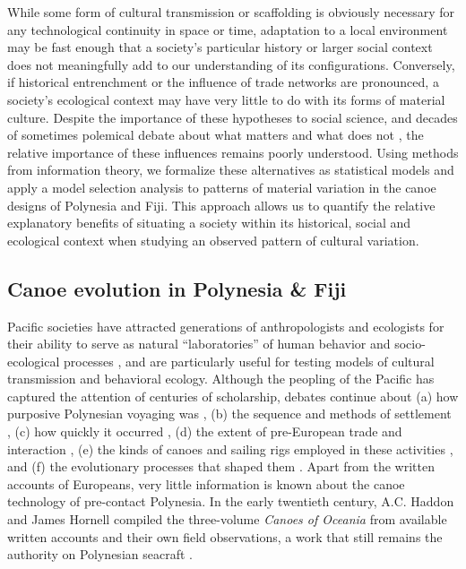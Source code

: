 While some form of cultural transmission or scaffolding is obviously necessary for any technological continuity in space or time, adaptation to a local environment may be fast  enough that a society's particular history or larger social context does not meaningfully add to our understanding of its configurations.  Conversely, if historical entrenchment or the influence of trade networks are pronounced, a society's ecological context may have very little to do with its forms of material culture.  Despite the importance of these hypotheses to social science, and decades of sometimes polemical debate about what matters and what does not \citep{Harris1968, Sahlins1976:critiqueSociobiology,Betzig1997humannature}, the relative importance of these influences remains poorly understood.  Using methods from information theory, we formalize these alternatives as statistical models and apply a model selection analysis to patterns of material variation in the canoe designs of Polynesia and Fiji. This approach allows us to quantify the relative explanatory benefits of situating a society within its historical, social and ecological context when studying an observed pattern of cultural variation.

\subsection{Canoe evolution in Polynesia \& Fiji}  

Pacific societies have attracted generations of anthropologists and ecologists for their ability to serve as natural ``laboratories'' of human behavior and socio-ecological processes \citep{Mead1957:PolynesianLab}, and are particularly useful for testing models of cultural transmission and behavioral ecology.  Although the peopling of the Pacific has captured the attention of centuries of scholarship, debates continue about (a) how purposive Polynesian voyaging was \citep{Whyte2005:PolyHumanEvol}, (b) the sequence and methods of settlement \citep{Irwin1992}, (c) how quickly it occurred \citep{Anderson2000:Slowboats, Thomas2008:Lastpulse, Gray2009:Phylogenies}, (d) the extent of pre-European trade and interaction  \citep{Weisler1998}, (e) the kinds of canoes and sailing rigs employed in these activities \citep{Doran1981canoes, Anderson2001:SharpEnd}, and (f) the evolutionary processes that shaped them \citep{Horridge1987:IndonesiaCanoes}.  Apart from the written accounts of Europeans, very little information is known about the canoe technology of pre-contact Polynesia.  In the early twentieth century, A.C. Haddon and James Hornell compiled the three-volume \textit{Canoes of Oceania} from available written accounts and their own field observations, a work that still remains the authority on Polynesian seacraft \citep{HaddonHornell1936}.


